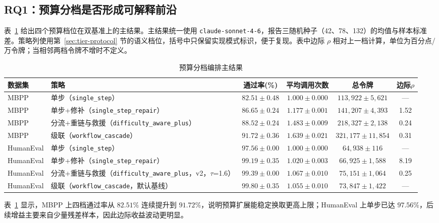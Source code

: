 \subsection{RQ1：预算分档是否形成可解释前沿}
\label{sec:rq1}

表~\ref{tab:main_results} 给出四个预算档位在双基准上的主结果。主结果统一使用 \texttt{claude-sonnet-4-6}，报告三随机种子（42、78、132）的均值与样本标准差。策略列使用第~\ref{sec:tier-protocol} 节的语义档位，括号中只保留实现模式标识，便于复现。表中边际 $\rho$ 相对上一档计算，单位为百分点/万令牌；当相邻两档令牌不增时不定义。

\begin{table}[!t]
\centering
\small
\caption{预算分档编排主结果}
\label{tab:main_results}
\begin{tabularx}{\textwidth}{@{}p{2.2cm} >{\raggedright\arraybackslash}X c c c c@{}}
\toprule
数据集 & 策略 & 通过率(\%) & 平均调用次数 & 总令牌 & 边际$\rho$ \\
\midrule
MBPP & 单步（\texttt{single\_step}） & $82.51\pm0.48$ & $1.000\pm0.000$ & $113{,}922\pm5{,}621$ & --- \\
MBPP & 单步+修补（\texttt{single\_step\_repair}） & $86.65\pm0.24$ & $1.177\pm0.001$ & $141{,}207\pm4{,}393$ & 1.52 \\
MBPP & 分流+重链与救援（\texttt{difficulty\_aware\_plus}） & $88.52\pm0.24$ & $1.483\pm0.009$ & $218{,}327\pm2{,}138$ & 0.24 \\
MBPP & 级联（\texttt{workflow\_cascade}） & $91.72\pm0.36$ & $1.639\pm0.021$ & $321{,}177\pm11{,}854$ & 0.31 \\
\midrule
HumanEval & 单步（\texttt{single\_step}） & $97.56\pm0.00$ & $1.000\pm0.000$ & $64{,}938\pm116$ & --- \\
HumanEval & 单步+修补（\texttt{single\_step\_repair}） & $99.19\pm0.35$ & $1.020\pm0.003$ & $66{,}925\pm1{,}588$ & 8.19 \\
HumanEval & 分流+重链与救援（\texttt{difficulty\_aware\_plus}，v2，$\tau$=1.6） & $99.39\pm0.00$ & $1.067\pm0.010$ & $75{,}151\pm1{,}064$ & 0.25 \\
HumanEval & 级联（\texttt{workflow\_cascade}，默认基线） & $99.80\pm0.35$ & $1.055\pm0.010$ & $73{,}847\pm1{,}422$ & --- \\
\bottomrule
\end{tabularx}
\end{table}

表~\ref{tab:main_results} 显示，MBPP 上四档通过率从 $82.51\%$ 连续提升到 $91.72\%$，说明预算扩展能稳定换取更高上限；HumanEval 上单步已达 $97.56\%$，后续增益主要来自少量残差样本，因此边际收益波动更明显。

